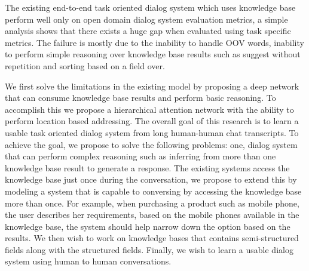 The existing end-to-end task oriented dialog system which uses knowledge base  perform well only on open domain dialog system evaluation metrics, a simple analysis shows that there exists a huge gap when evaluated using task specific metrics. The failure is mostly due to the inability to handle OOV words, inability to perform simple reasoning over knowledge base results such as suggest without repetition and sorting based on a field over.

We first solve the limitations in the existing model by proposing a deep network that can consume knowledge base results and perform basic reasoning. To accomplish this we propose a hierarchical attention network with the ability to perform location based addressing. The overall goal of this research is to learn a usable task oriented dialog system from long human-human chat transcripts. To achieve the goal, we propose to solve the following problems: one, dialog system that can perform complex reasoning such as inferring from more than one knowledge base result to generate a response. The existing systems access the knowledge base just once during the conversation, we propose to extend this by modeling a system that is capable to conversing by accessing the knowledge base more than once. For example, when purchasing a product such as mobile phone, the user describes her requirements,  based on the mobile phones available in the knowledge base, the system should help narrow down the option based on the results. We then wish to work on knowledge bases that contains semi-structured fields along with the structured fields. Finally, we wish to learn a usable dialog system using human to human conversations.